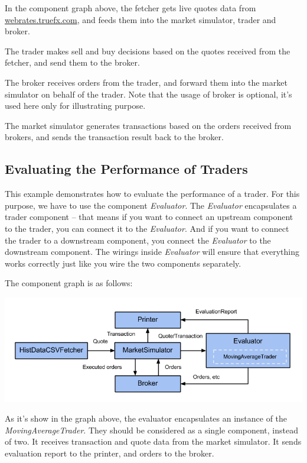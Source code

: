 In the component graph above, the fetcher gets live quotes data from \url{webrates.truefx.com}, and feeds them into the market simulator, trader and broker.

The trader makes sell and buy decisions based on the quotes received from the fetcher, and send them to the broker.

The broker receives orders from the trader, and forward them into the market simulator on behalf of the trader. Note that the usage of broker is optional, it's used here only for illustrating purpose.

The market simulator generates transactions based on the orders received from brokers, and sends the transaction result back to the broker.


\subsection{Evaluating the Performance of Traders}

This example demonstrates how to evaluate the performance of a trader. For this purpose, we have to use the component \emph{Evaluator}. The \emph{Evaluator} encapsulates a trader component -- that means if you want to connect an upstream component to the trader, you can connect it to the \emph{Evaluator}. And if you want to connect the trader to a downstream component, you connect the \emph{Evaluator} to the downstream component. The wirings inside \emph{Evaluator} will ensure that everything works correctly just like you wire the two components separately.

The component graph is as follows:

\noindent
\includegraphics[width=\textwidth]{img/examples/evaluation}

As it's show in the graph above, the evaluator encapsulates an instance of the \emph{MovingAverageTrader}. They should be considered as a single component, instead of two. It receives transaction and quote data from the market simulator. It sends evaluation report to the printer, and orders to the broker.

